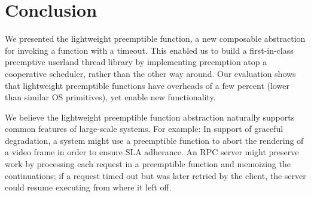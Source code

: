 \section{Conclusion}

We presented the lightweight preemptible function, a new composable abstraction
for invoking a function with a timeout.  This enabled us to build a first-in-class
preemptive userland thread library by implementing preemption atop a cooperative
scheduler, rather than the other way around.  Our evaluation shows that lightweight
preemptible functions have overheads of a few percent (lower than similar OS
primitives), yet enable new functionality.

We believe the lightweight preemptible function abstraction naturally supports
common features of large-scale systems.  For example:  In support of graceful
degradation, a system might use a preemptible function to abort the rendering of a
video frame in order to ensure SLA adherance.  An RPC server might preserve work by
processing each request in a preemptible function and memoizing the continuations; if
a request timed out but was later retried by the client, the server could resume
executing from where it left off.
